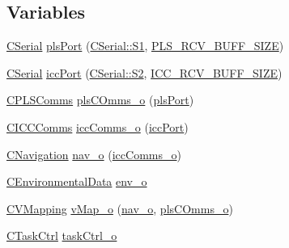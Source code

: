 \subsection*{Variables}
\begin{DoxyCompactItemize}
\item 
\mbox{\hyperlink{class_c_serial}{C\+Serial}} \mbox{\hyperlink{_a_d_a_s___nav_u_8ino_a5427ed2b254fc7bb97bb9c8b92af7d60}{pls\+Port}} (\mbox{\hyperlink{class_c_serial_a000039540cc90b18bafacf5744e7eda2a2a245d3c55e5b6e7052daf261924ce08}{C\+Serial\+::\+S1}}, \mbox{\hyperlink{_a_d_a_s___cfg_8h_a00f72db64cf681b08d61977df126ec76}{P\+L\+S\+\_\+\+R\+C\+V\+\_\+\+B\+U\+F\+F\+\_\+\+S\+I\+ZE}})
\item 
\mbox{\hyperlink{class_c_serial}{C\+Serial}} \mbox{\hyperlink{_a_d_a_s___nav_u_8ino_ad1e6d9fed4369104e412a46c019634d2}{icc\+Port}} (\mbox{\hyperlink{class_c_serial_a000039540cc90b18bafacf5744e7eda2a8cc95f4591147b0df028e003f82220a1}{C\+Serial\+::\+S2}}, \mbox{\hyperlink{_a_d_a_s___cfg_8h_abf41bed56ee0b2a8858687c4420bb110}{I\+C\+C\+\_\+\+R\+C\+V\+\_\+\+B\+U\+F\+F\+\_\+\+S\+I\+ZE}})
\item 
\mbox{\hyperlink{class_c_p_l_s_comms}{C\+P\+L\+S\+Comms}} \mbox{\hyperlink{_a_d_a_s___nav_u_8ino_add0df3806d74ba741b1d6bc5452d7e79}{pls\+C\+Omms\+\_\+o}} (\mbox{\hyperlink{_a_d_a_s___nav_u_8ino_a5427ed2b254fc7bb97bb9c8b92af7d60}{pls\+Port}})
\item 
\mbox{\hyperlink{class_c_i_c_c_comms}{C\+I\+C\+C\+Comms}} \mbox{\hyperlink{_a_d_a_s___nav_u_8ino_a62ef6b3308259edb69af585549178324}{icc\+Comms\+\_\+o}} (\mbox{\hyperlink{_a_d_a_s___nav_u_8ino_ad1e6d9fed4369104e412a46c019634d2}{icc\+Port}})
\item 
\mbox{\hyperlink{class_c_navigation}{C\+Navigation}} \mbox{\hyperlink{_a_d_a_s___nav_u_8ino_a8abc3c3b0c6950fd83525420d5ca0dd2}{nav\+\_\+o}} (\mbox{\hyperlink{_a_d_a_s___nav_u_8ino_a62ef6b3308259edb69af585549178324}{icc\+Comms\+\_\+o}})
\item 
\mbox{\hyperlink{class_c_environmental_data}{C\+Environmental\+Data}} \mbox{\hyperlink{_a_d_a_s___nav_u_8ino_a6c839a9b171c9b833a61a0d7612e2da8}{env\+\_\+o}}
\item 
\mbox{\hyperlink{class_c_v_mapping}{C\+V\+Mapping}} \mbox{\hyperlink{_a_d_a_s___nav_u_8ino_a0c99773e7f5600fecea038efac852ddc}{v\+Map\+\_\+o}} (\mbox{\hyperlink{_a_d_a_s___nav_u_8ino_a8abc3c3b0c6950fd83525420d5ca0dd2}{nav\+\_\+o}}, \mbox{\hyperlink{_a_d_a_s___nav_u_8ino_add0df3806d74ba741b1d6bc5452d7e79}{pls\+C\+Omms\+\_\+o}})
\item 
\mbox{\hyperlink{class_c_task_ctrl}{C\+Task\+Ctrl}} \mbox{\hyperlink{_a_d_a_s___nav_u_8ino_a4e98d90206033e0ef6b58d0d11930bac}{task\+Ctrl\+\_\+o}}
\end{DoxyCompactItemize}


